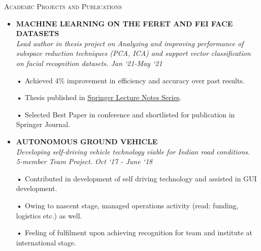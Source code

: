 
\textsc{Academic Projects and Publications}

\begin{itemize}[left=1.3em, labelsep=0.2em, labelwidth=2em, align=parleft]
\item
  \textbf{MACHINE LEARNING ON THE FERET AND FEI FACE DATASETS} 
  \\ 
  \noindent\emph{Lead author in thesis project on Analyzing and improving performance of subspace reduction techniques (PCA, ICA) and support vector classification on facial recognition datasets. \hfill \emph{Jan `21-May `21}}

    {\bfseries •} Achieved 4\% improvement in efficiency and accuracy over past
    results.
    
    {\bfseries •} Thesis published in
    \href{https://link.springer.com/chapter/10.1007/978-981-16-6285-0_62}{Springer
    Lecture Notes Series}. 

    {\bfseries •} Selected Best Paper in conference and shortlisted for publication in
    Springer Journal.
    
\end{itemize}


\begin{itemize}[left=1.3em, labelsep=0.2em, labelwidth=2em, align=parleft]
\item
  \textbf{AUTONOMOUS GROUND VEHICLE} 
  \\ 
  \noindent\emph{Developing self-driving vehicle technology viable for Indian road
  conditions. \\ 5-member Team Project. \hfill \emph {Oct `17 - June `18}}
  
  {\bfseries •} Contributed in development of self driving technology and assisted
    in GUI development.
    
  {\bfseries •} Owing to nascent stage, managed operations activity (read: funding, logistics etc.) as well. 

  {\bfseries •} Feeling of fulfilment upon achieving recognition for team and institute at international stage.
  \\
\end{itemize}
